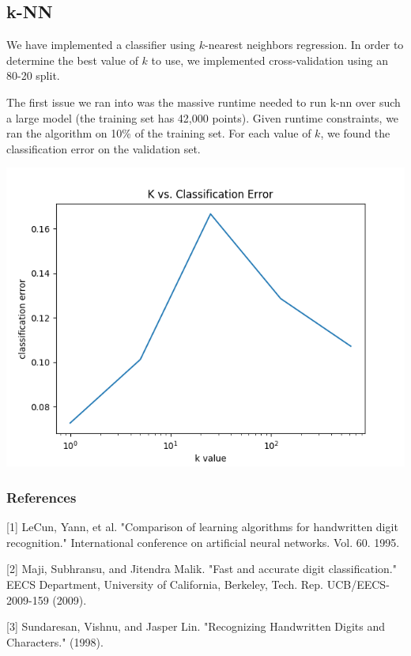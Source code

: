 \documentclass{article} %
\begin{document}
\subsection{k-NN}
We have implemented a classifier using $k$-nearest neighbors regression. In
order to determine the best value of $k$ to use, we implemented cross-validation
using an 80-20 split.

The first issue we ran into was the massive runtime needed to run k-nn over such
a large model (the training set has 42,000 points). Given runtime constraints,
we ran the algorithm on 10\% of the training set.
For each value of $k$, we found the classification error on the validation set.

\includegraphics{k-nn.png}



\subsubsection*{References}

\small{
  [1] LeCun, Yann, et al. "Comparison of learning algorithms for handwritten
  digit recognition." International conference on artificial neural networks.
  Vol. 60. 1995.	

  [2] Maji, Subhransu, and Jitendra Malik. "Fast and accurate digit
  classification." EECS Department, University of California,
  Berkeley, Tech. Rep. UCB/EECS-2009-159 (2009).

  [3] Sundaresan, Vishnu, and Jasper Lin. "Recognizing Handwritten Digits and
  Characters." (1998).
}
\end{document}
